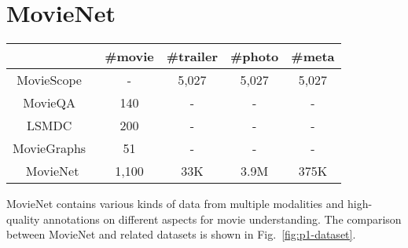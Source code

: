 \section{MovieNet}
\label{sec:p1-dataset}

\begin{table*}[]
	\centering
	\begin{tabular}{c|c|c|c|c}
		\hline
		\multicolumn{1}{l|}{}  & \#movie & \#trailer & \#photo  & \#meta \\ \hline
		MovieScope~\cite{cascante2019moviescope}             & -        & 5,027      & 5,027     & 5,027  \\ \hline
		MovieQA~\cite{tapaswi2016movieqa}                & 140      & -          & -         & -      \\ \hline
		LSMDC~\cite{rohrbach2015dataset}                  & 200       & -          & -         & -     \\ \hline
		MovieGraphs~\cite{vicol2018moviegraphs}             & 51       & -          & -         & -     \\ \hline
		MovieNet               & 1,100    & 33K     & 3.9M & 375K \\ \hline
	\end{tabular}
	\caption{A Table.}
	\label{fig:p1-dataset}
\end{table*}


MovieNet contains various kinds of data from multiple modalities and high-quality annotations on different aspects for movie understanding.
The comparison between MovieNet and related datasets is shown in Fig.~\ref{fig:p1-dataset}.



